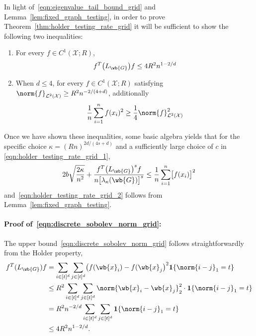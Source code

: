 \documentclass{article}
\newcommand{\1}{\mathbf{1}}
\newcommand{\Xset}{\mathcal{X}}
\newcommand{\Leb}{\mathcal{L}}
\theoremstyle{alden}
\theoremstyle{aldenthm}
\theoremstyle{definition}
\theoremstyle{remark}
\begin{document}
In light of~\eqref{eqn:eigenvalue_tail_bound_grid} and Lemma~\ref{lem:fixed_graph_testing}, in order to prove Theorem~\ref{thm:holder_testing_rate_grid} it will be sufficient to show the following two inequalities:
\begin{enumerate}[label=(E\arabic*)]
	\item 
	\label{event:test_1}
	
	For every $f \in C^1(\Xset;R)$,
	\begin{equation}
	\label{eqn:discrete_sobolev_norm_grid}
	f^T \bigl(L_{\wb{G}}\bigr) f \leq 4R^2 n^{1 - 2/d}
	\end{equation}
	\item 
	\label{event:test_2}
	
	When $d \leq 4$, for every $f \in C^1(\Xset;R)$ satisfying $\norm{f}_{\Leb^2(\Xset)} \geq R^2 n^{-2/(4 + d)}$, additionally
	\begin{equation}
	\label{eqn:l2_to_empirical_norm_grid}
	\frac{1}{n}\sum_{i = 1}^{n} f(x_i)^2 \geq \frac{1}{4}\norm{f}_{\Leb^2(\Xset)}^2
	\end{equation}
\end{enumerate}
Once we have shown these inequalities, some basic algebra yields that for the specific choice $\kappa = (Rn)^{2d/(4s + d)}$ and a sufficiently large choice of $c$ in \eqref{eqn:holder_testing_rate_grid_1},
\begin{align*}
2b\sqrt{\frac{2\kappa}{n^2}} + \frac{f^T \bigl(L_{\wb{G}}\bigr)^s f}{n\bigl[\lambda_{\kappa}(\wb{G})\bigr]^s} \leq \frac{1}{n}\sum_{i = 1}^{n}\bigl[f(x_i)\bigr]^2
\end{align*}
and~\eqref{eqn:holder_testing_rate_grid_2} follows from Lemma~\ref{lem:fixed_graph_testing}.

\paragraph{Proof of~\eqref{eqn:discrete_sobolev_norm_grid}:}
The upper bound~\eqref{eqn:discrete_sobolev_norm_grid} follows straightforwardly from the Holder property,
\begin{align*}
f^T (L_{\wb{G}}) f & = \sum_{i \in [t]^d} \sum_{j \in [t]^d} \bigl(f(\wb{x}_i) - f(\wb{x}_j\bigr)^2 \1\{\norm{i - j}_1 = t\} \\
& \leq R^2 \sum_{i \in [t]^d} \sum_{j \in [t]^d} \norm{\wb{x}_i - \wb{x}_j}_2^2 \cdot  \1\{\norm{i - j}_1 = t\} \\
& = R^2 n^{-2/d} \sum_{i \in [t]^d} \sum_{j \in [t]^d} \1\{\norm{i - j}_1 = t\}  \\
& \leq 4 R^2 n^{1 - 2/d}.
\end{align*}
\end{document}
